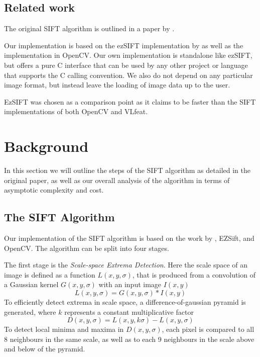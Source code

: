 \documentclass[letterpaper]{article}
\begin{document}
\subsection*{Related work}
The original SIFT algorithm is outlined in a paper by \citet{lowe2004distinctive}\cite{lowe1999object}.

Our implementation is based on the ezSIFT implementation by \citet{ezsift} as well as the implementation in OpenCV\cite{opencv}. Our own implementation is standalone like ezSIFT, but offers a pure C interface that can be used by any other project or language that supports the C calling convention. We also do not depend on any particular image format, but instead leave the loading of image data up to the user.

EzSIFT was chosen as a comparison point as it claims to be faster than the SIFT implementations of both OpenCV and VLfeat.

\section{Background}\label{sec:background}
In this section we will outline the steps of the SIFT algorithm as detailed in the original paper\cite{lowe2004distinctive}, as well as our overall analysis of the algorithm in terms of asymptotic complexity and cost.

\subsection*{The SIFT Algorithm}
Our implementation of the SIFT algorithm is based on the work by \citet{lowe2004distinctive}, EZSift\cite{ezsift}, and OpenCV\cite{opencv}. The algorithm can be split into four stages.

The first stage is the \emph{Scale-space Extrema Detection}. Here the scale space of an image is defined as a function $L(x,y,\sigma)$, that is produced from a convolution of a Gaussian kernel $G(x,y,\sigma)$ with an input image $I(x,y)$
\begin{equation}
    L(x,y,\sigma)=G(x,y,\sigma) * I(x,y)
\end{equation}
To efficiently detect extrema in scale space, a difference-of-gaussian pyramid is generated, where $k$ represents a constant multiplicative factor
\begin{equation}
    D(x,y,\sigma) = L(x,y,k\sigma) - L(x,y,\sigma)
\end{equation}
To detect local minima and maxima in $D(x,y,\sigma)$, each pixel is compared to all 8 neighbours in the same scale, as well as to each 9 neighbours in the scale above and below of the pyramid.
\end{document}

